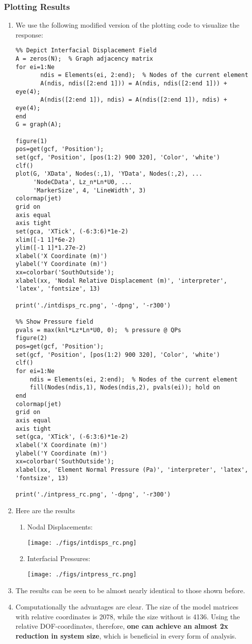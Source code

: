 \documentclass[11pt]{article}
\begin{document}
\subsubsection{Plotting Results}
\label{sec:org3dbb5c2}
\begin{enumerate}
\item We use the following modified version of the plotting code to visualize the response:
\begin{verbatim}
%% Depict Interfacial Displacement Field
A = zeros(N);  % Graph adjacency matrix
for ei=1:Ne
       ndis = Elements(ei, 2:end);  % Nodes of the current element
       A(ndis, ndis([2:end 1])) = A(ndis, ndis([2:end 1])) + eye(4);
       A(ndis([2:end 1]), ndis) = A(ndis([2:end 1]), ndis) + eye(4);
end
G = graph(A);

figure(1)
pos=get(gcf, 'Position');
set(gcf, 'Position', [pos(1:2) 900 320], 'Color', 'white')
clf()
plot(G, 'XData', Nodes(:,1), 'YData', Nodes(:,2), ...
     'NodeCData', Lz_n*Ln*U0, ...
     'MarkerSize', 4, 'LineWidth', 3)
colormap(jet)
grid on
axis equal
axis tight
set(gca, 'XTick', (-6:3:6)*1e-2)
xlim([-1 1]*6e-2)
ylim([-1 1]*1.27e-2)
xlabel('X Coordinate (m)')
ylabel('Y Coordinate (m)')
xx=colorbar('SouthOutside');
xlabel(xx, 'Nodal Relative Displacement (m)', 'interpreter', 'latex', 'fontsize', 13)

print('./intdisps_rc.png', '-dpng', '-r300')

%% Show Pressure field
pvals = max(knl*Lz*Ln*U0, 0);  % pressure @ QPs
figure(2)
pos=get(gcf, 'Position');
set(gcf, 'Position', [pos(1:2) 900 320], 'Color', 'white')
clf()
for ei=1:Ne
    ndis = Elements(ei, 2:end);  % Nodes of the current element
    fill(Nodes(ndis,1), Nodes(ndis,2), pvals(ei)); hold on
end
colormap(jet)
grid on
axis equal
axis tight
set(gca, 'XTick', (-6:3:6)*1e-2)
xlabel('X Coordinate (m)')
ylabel('Y Coordinate (m)')
xx=colorbar('SouthOutside');
xlabel(xx, 'Element Normal Pressure (Pa)', 'interpreter', 'latex', 'fontsize', 13)

print('./intpress_rc.png', '-dpng', '-r300')
\end{verbatim}
\item Here are the results
\begin{enumerate}
\item Nodal Displacements:
\begin{center}
\texttt{[image: ./figs/intdisps\_rc.png]}
\end{center}
\item Interfacial Pressures:
\begin{center}
\texttt{[image: ./figs/intpress\_rc.png]}
\end{center}
\end{enumerate}
\item The results can be seen to be almost nearly identical to those shown before.
\item Computationally the advantages are clear.
The size of the model matrices with relative coordinates is 2078, while the size without is 4136.
Using the relative DOF-coordinates, therefore, \textbf{one can achieve an almost 2x reduction in system size}, which is beneficial in every form of analysis.
\end{enumerate}
\pagebreak
\end{document}
